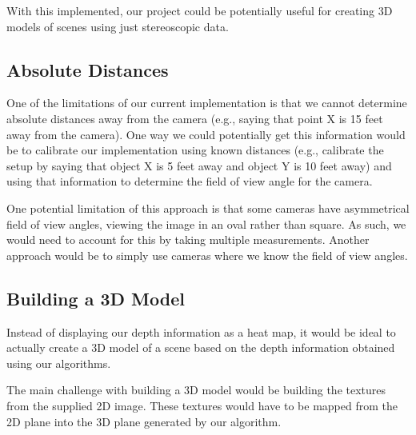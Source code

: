With this implemented, our project could be potentially useful for creating 3D models of scenes using just stereoscopic data.

\subsection{Absolute Distances}
One of the limitations of our current implementation is that we cannot determine absolute distances away from the camera (e.g., saying that point X is 15 feet away from the camera). One way we could potentially get this information would be to calibrate our implementation using known distances (e.g., calibrate the setup by saying that object X is 5 feet away and object Y is 10 feet away) and using that information to determine the field of view angle for the camera. 

One potential limitation of this approach is that some cameras have asymmetrical field of view angles, viewing the image in an oval rather than square. As such, we would need to account for this by taking multiple measurements. Another approach would be to simply use cameras where we know the field of view angles.

\subsection{Building a 3D Model}
Instead of displaying our depth information as a heat map, it would be ideal to actually create a 3D model of a scene based on the depth information obtained using our algorithms. 

The main challenge with building a 3D model would be building the textures from the supplied 2D image. These textures would have to be mapped from the 2D plane into the 3D plane generated by our algorithm. 
